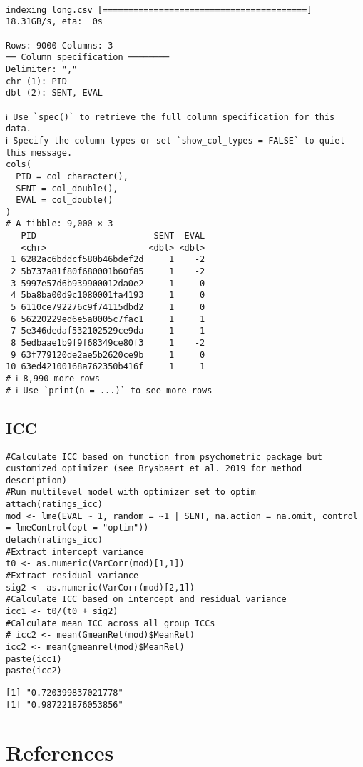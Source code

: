 \documentclass[a4paper,10pt,onecolumn,oneside,openright]{article}
\begin{document}
\begin{verbatim}

indexing long.csv [========================================] 18.31GB/s, eta:  0s
                                                                                                                   
Rows: 9000 Columns: 3
── Column specification ────────
Delimiter: ","
chr (1): PID
dbl (2): SENT, EVAL

ℹ Use `spec()` to retrieve the full column specification for this data.
ℹ Specify the column types or set `show_col_types = FALSE` to quiet this message.
cols(
  PID = col_character(),
  SENT = col_double(),
  EVAL = col_double()
)
# A tibble: 9,000 × 3
   PID                       SENT  EVAL
   <chr>                    <dbl> <dbl>
 1 6282ac6bddcf580b46bdef2d     1    -2
 2 5b737a81f80f680001b60f85     1    -2
 3 5997e57d6b939900012da0e2     1     0
 4 5ba8ba00d9c1080001fa4193     1     0
 5 6110ce792276c9f74115dbd2     1     0
 6 56220229ed6e5a0005c7fac1     1     1
 7 5e346dedaf532102529ce9da     1    -1
 8 5edbaae1b9f9f68349ce80f3     1    -2
 9 63f779120de2ae5b2620ce9b     1     0
10 63ed42100168a762350b416f     1     1
# ℹ 8,990 more rows
# ℹ Use `print(n = ...)` to see more rows
\end{verbatim}

\subsection{ICC}
\label{sec:org8e596f8}
\begin{verbatim}
#Calculate ICC based on function from psychometric package but customized optimizer (see Brysbaert et al. 2019 for method description)
#Run multilevel model with optimizer set to optim
attach(ratings_icc)
mod <- lme(EVAL ~ 1, random = ~1 | SENT, na.action = na.omit, control = lmeControl(opt = "optim"))
detach(ratings_icc)
#Extract intercept variance
t0 <- as.numeric(VarCorr(mod)[1,1])
#Extract residual variance
sig2 <- as.numeric(VarCorr(mod)[2,1])
#Calculate ICC based on intercept and residual variance
icc1 <- t0/(t0 + sig2)
#Calculate mean ICC across all group ICCs
# icc2 <- mean(GmeanRel(mod)$MeanRel)
icc2 <- mean(gmeanrel(mod)$MeanRel)
paste(icc1)
paste(icc2)
\end{verbatim}

\begin{verbatim}
[1] "0.720399837021778"
[1] "0.987221876053856"
\end{verbatim}

\section*{References}
\label{sec:orgcb882a2}

\printbibliography[heading=none]
\end{document}
